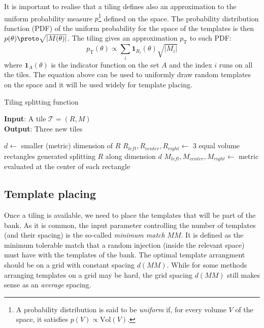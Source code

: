 \documentclass[twocolumn,showpacs,preprintnumbers,nofootinbib,prd,
superscriptaddress,10pt]{revtex4-1}
\begin{document}
It is important to realise that a tiling defines also an approximation to the uniform probability measure $p$\footnote{
A probability distribution is said to be {\it uniform} if, for every volume $V$ of the space, it satisfies $p(V) \propto \text{Vol}(V)$.}
defined on the space.
The probability distribution function (PDF) of the uniform probability for the space of the templates is then $p(\theta) \proto \sqrt{|M(\theta)|}$.
The tiling gives an approximation $p_{\text{T}}$ to such PDF:
\begin{equation}\label{eq:tiling_pdf}
	p_{\text{T}}(\theta) \propto \sum_i \mathbf{1}_{R_i}(\theta) \sqrt{|M_i|}
\end{equation}
where $\mathbf{1}_A(\theta)$ is the indicator function on the set $A$ and the index $i$ runs on all the tiles.
The equation above can be used to uniformly draw random templates on the space and it will be used widely for template placing.


\begin{algorithm}[t]
\caption{Tiling splitting function}
\flushleft
\hspace*{\algorithmicindent} \textbf{Input}: A tile $\mathcal{T} = \left(R, M\right)$ \\
\hspace*{\algorithmicindent} \textbf{Output}: Three new tiles
\begin{algorithmic}
	  \State $d \gets $ smaller (metric) dimension of $R$
	  \State $R_{left}, R_{center}, R_{right} \gets $ 3 equal volume rectangles generated splitting $R$ along dimension $d$ 
	  \State $M_{left}, M_{center}, M_{right} \gets $ metric evaluated at the center of each rectangle
	  \State{}
	\EndProcedure
\end{algorithmic}
\label{alg:tiling}
\end{algorithm}

\subsection{Template placing} \label{sec:template_placing}

Once a tiling is available, we need to place the templates that will be part of the bank.
As it is common, the input parameter controlling the number of templates (and their spacing) is the so-called {\it minimum match} $MM$. It is defined as the minimum tolerable match that a random injection (inside the relevant space) must have with the templates of the bank.
The optimal template arrangment should be on a grid with constant spacing $d(MM)$. While for some methods arranging templates on a grid may be hard, the grid spacing $d(MM)$ still makes sense as an {\it average} spacing.
\end{document}
